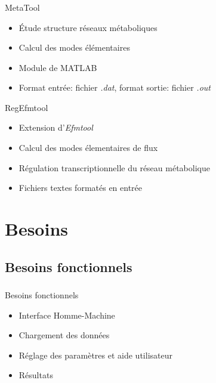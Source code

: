\documentclass[11pt]{beamer}
\begin{document}
\begin{frame}
\frametitle{\secname}
	\begin{block}{MetaTool}
	\begin{itemize}
	\item Étude structure réseaux métaboliques
	\item Calcul des modes élémentaires
	\item Module de MATLAB 
	\item Format entrée: fichier \textit{.dat}, format sortie: fichier \textit{.out}
	
	\end{itemize}
	\end{block}	
	
	\begin{block}{RegEfmtool}
	\begin{itemize}
	\item Extension d'\textit{Efmtool}
	\item Calcul des modes élementaires de flux
	\item Régulation transcriptionnelle du réseau métabolique
	\item Fichiers textes formatés en entrée
	\end{itemize}
	\end{block}
\end{frame}

\section{Besoins	}	

\subsection{Besoins fonctionnels}

\begin{frame}
	\frametitle{\subsecname}
	\begin{block}{Besoins fonctionnels}
		\begin{itemize}
		\item Interface Homme-Machine
		\item Chargement des données
		\item Réglage des paramètres et aide utilisateur
		\item Résultats
		\end{itemize}
	\end{block}
\end{frame}
\end{document}
